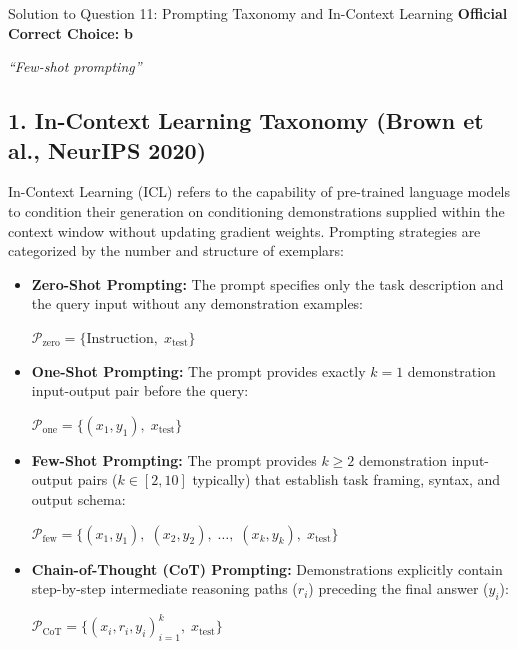\documentclass[11pt,a4paper]{article}
\begin{document}
\vspace{0.4cm}

\begin{solutionbox}{Solution to Question 11: Prompting Taxonomy and In-Context Learning}
\textbf{Official Correct Choice:} \textbf{b}
\begin{center}
    \textit{``Few-shot prompting''}
\end{center}

\medskip
\subsection*{1. In-Context Learning Taxonomy (Brown et al., NeurIPS 2020)}
In-Context Learning (ICL) refers to the capability of pre-trained language models to condition their generation on conditioning demonstrations supplied within the context window without updating gradient weights. Prompting strategies are categorized by the number and structure of exemplars:

\begin{tcolorbox}[colback=white,colframe=secondary,arc=2mm,title=\textbf{Taxonomy of Prompting Techniques}]
\small
\begin{itemize}[leftmargin=1.5em,itemsep=3pt]
    \item \textbf{Zero-Shot Prompting:} The prompt specifies only the task description and the query input without any demonstration examples:
    \begin{center}
        $\mathcal{P}_{\text{zero}} = \{\text{Instruction},\; x_{\text{test}}\}$
    \end{center}
    \item \textbf{One-Shot Prompting:} The prompt provides exactly $k = 1$ demonstration input-output pair before the query:
    \begin{center}
        $\mathcal{P}_{\text{one}} = \{(x_1, y_1),\; x_{\text{test}}\}$
    \end{center}
    \item \textbf{Few-Shot Prompting:} The prompt provides $k \ge 2$ demonstration input-output pairs ($k \in [2, 10]$ typically) that establish task framing, syntax, and output schema:
    \begin{center}
        $\mathcal{P}_{\text{few}} = \{(x_1, y_1),\; (x_2, y_2),\; \dots,\; (x_k, y_k),\; x_{\text{test}}\}$
    \end{center}
    \item \textbf{Chain-of-Thought (CoT) Prompting:} Demonstrations explicitly contain step-by-step intermediate reasoning paths ($r_i$) preceding the final answer ($y_i$):
    \begin{center}
        $\mathcal{P}_{\text{CoT}} = \{(x_i, r_i, y_i)_{i=1}^k,\; x_{\text{test}}\}$
    \end{center}
\end{itemize}
\end{tcolorbox}


\end{solutionbox}
\end{document}
